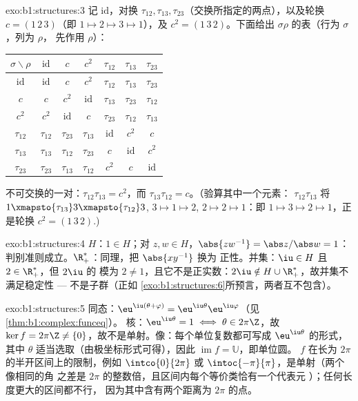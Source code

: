 \begin{solution}{exo:b1:structures:3}
记 $\mathrm{id}$，对换 $\tau_{12}, \tau_{13},
\tau_{23}$（交换所指定的两点），以及轮换 $c =
(1\,2\,3)$（即 $1 \mapsto 2 \mapsto 3 \mapsto 1$），及 $c^2 =
(1\,3\,2)$。下面给出 $\sigma\rho$ 的表（行为 $\sigma$，列为 $\rho$，
先作用 $\rho$）：
\begin{center}
\renewcommand{\arraystretch}{1.2}
\begin{tabular}{c|cccccc}
$\sigma\backslash\rho$ & $\mathrm{id}$ & $c$ & $c^2$ & $\tau_{12}$ &
$\tau_{13}$ & $\tau_{23}$ \\
\hline
$\mathrm{id}$ & $\mathrm{id}$ & $c$ & $c^2$ & $\tau_{12}$ &
$\tau_{13}$ & $\tau_{23}$ \\
$c$ & $c$ & $c^2$ & $\mathrm{id}$ & $\tau_{13}$ & $\tau_{23}$ &
$\tau_{12}$ \\
$c^2$ & $c^2$ & $\mathrm{id}$ & $c$ & $\tau_{23}$ & $\tau_{12}$ &
$\tau_{13}$ \\
$\tau_{12}$ & $\tau_{12}$ & $\tau_{23}$ & $\tau_{13}$ & $\mathrm{id}$
& $c^2$ & $c$ \\
$\tau_{13}$ & $\tau_{13}$ & $\tau_{12}$ & $\tau_{23}$ & $c$ &
$\mathrm{id}$ & $c^2$ \\
$\tau_{23}$ & $\tau_{23}$ & $\tau_{13}$ & $\tau_{12}$ & $c^2$ & $c$ &
$\mathrm{id}$ \\
\end{tabular}
\end{center}
不可交换的一对：$\tau_{12}\tau_{13} = c^2$，而
$\tau_{13}\tau_{12} = c$。（验算其中一个元素：
$\tau_{12}\tau_{13}$ 将 $1 \xmapsto{\tau_{13}} 3
\xmapsto{\tau_{12}} 3$, $3 \mapsto 1 \mapsto 2$, $2 \mapsto 2 \mapsto
1$：即 $1 \mapsto 3 \mapsto 2 \mapsto 1$，正是轮换 $c^2 =
(1\,3\,2)$.)
\end{solution}

\begin{solution}{exo:b1:structures:4}
$H$：$1 \in H$；对 $z, w \in H$，$\abs{zw^{-1}} = \abs z / \abs w =
1$：判别准则成立。$\R_+^*$：同理，把 $\abs{xy^{-1}}$ 换为
正性。并集：$\iu \in H$ 且 $2 \in \R_+^*$，但 $2\iu$ 的
模为 $2 \neq 1$，且它不是正实数：$2\iu \notin H \cup
\R_+^*$，故并集不满足稳定性 --- 不是子群（正如
\cref{exo:b1:structures:6}所预言，两者互不包含）。
\end{solution}

\begin{solution}{exo:b1:structures:5}
同态：$\eu^{\iu(\theta + \varphi)} =
\eu^{\iu\theta}\eu^{\iu\varphi}$（见\cref{thm:b1:complex:funceq}）。
核：$\eu^{\iu\theta} = 1 \iff \theta \in 2\pi\Z$，故 $\ker f =
2\pi\Z \neq \{0\}$，故不是单射。像：每个单位复数都可写成
$\eu^{\iu\theta}$ 的形式，其中 $\theta$ 适当选取（由极坐标形式可得），因此
$\operatorname{im} f = \mathbb{U}$，即单位圆。
$f$ 在长为 $2\pi$ 的半开区间上的限制，例如
$\intco{0}{2\pi}$ 或 $\intoc{-\pi}{\pi}$，是单射（两个像相同的角
之差是 $2\pi$ 的整数倍，且区间内每个等价类恰有一个代表元
）；任何长度更大的区间都不行，
因为其中含有两个距离为
$2\pi$ 的点。
\end{solution}

